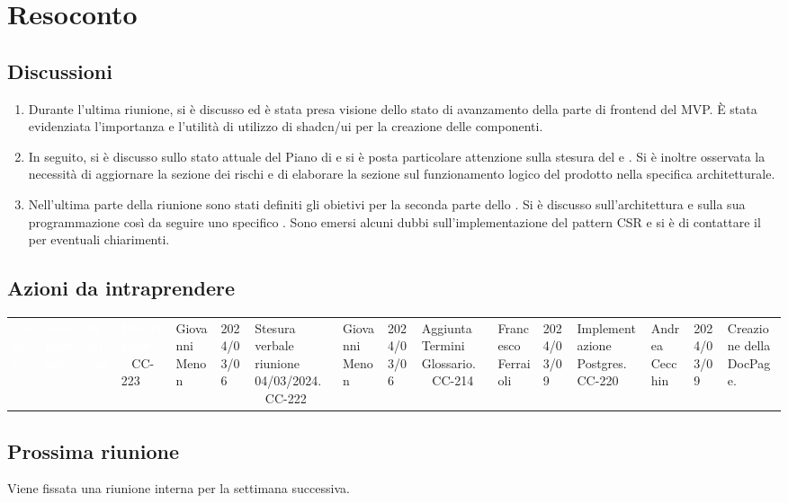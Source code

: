 \section{Resoconto} \label{sec:resoconto}
\subsection{Discussioni} \label{subsec:resdiscussione}
\begin{enumerate}
    \item Durante l'ultima riunione, si è discusso ed è stata presa visione dello stato di avanzamento della parte di frontend del MVP. È stata evidenziata l'importanza e l'utilità di utilizzo di shadcn/ui per la creazione delle componenti.
    \item In seguito, si è discusso sullo stato attuale del Piano di  e si è posta particolare attenzione sulla stesura del  e . Si è inoltre osservata la necessità di aggiornare la sezione dei rischi e di elaborare la sezione sul funzionamento logico del prodotto nella specifica architetturale.
    \item Nell'ultima parte della riunione sono stati definiti gli obietivi per la seconda parte dello . Si è discusso sull'architettura e sulla sua programmazione così da seguire uno specifico . Sono emersi alcuni dubbi sull'implementazione del pattern CSR e si è di contattare il  per eventuali chiarimenti.
\end{enumerate}



\subsection{Azioni da intraprendere}
{
\setlength{\tabcolsep}{10pt}
\renewcommand{\arraystretch}{1.5}
\begin{tabularx}{\textwidth}{| l | l | l | X |}
\hline
{}\textbf{\textcolor{white}{Codice }} & \textbf{\textcolor{white}{Assegnatario}} & \textbf{\textcolor{white}{Scadenza}} & \textbf{\textcolor{white}{Descrizione}} \
\hline
CC-223 & Giovanni Menon &2024/03/06 & Stesura verbale riunione 04/03/2024. \
\hline
CC-222 & Giovanni Menon &2024/03/06 & Aggiunta Termini Glossario. \
\hline
CC-214 & Francesco Ferraioli &2024/03/09 & Implementazione Postgres. \
\hline
CC-220 & Andrea Cecchin &2024/03/09 & Creazione della DocPage. \
\hline
\end{tabularx}
}


\subsection{Prossima riunione} \label{subsec:riunione}
Viene fissata una riunione interna per la settimana successiva.